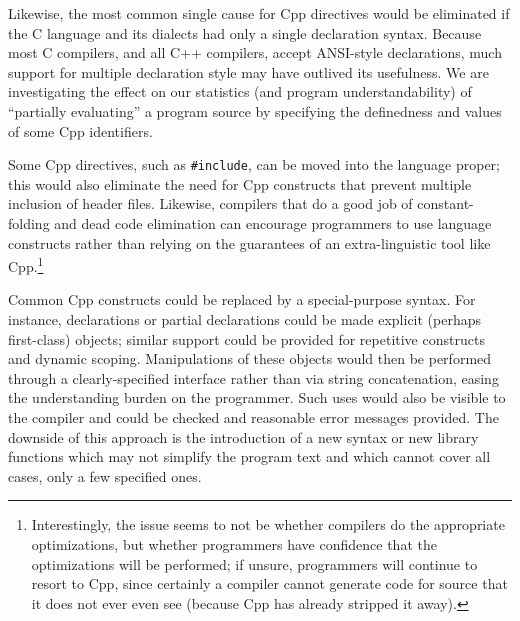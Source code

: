 \documentclass[11pt]{article}
\begin{document}
Likewise, the most common single cause for Cpp directives would be
eliminated if the C language and its dialects had only a single declaration
syntax.  Because most C compilers, and all C++ compilers, accept ANSI-style
declarations, much support for multiple declaration style may have outlived
its usefulness.  We are investigating the effect on our statistics (and
program understandability) of ``partially evaluating'' a program source by
specifying the definedness and values of some Cpp identifiers.

Some Cpp directives, such as {\tt \#include}, can be moved into the
language proper; this would also eliminate the need for Cpp constructs that
prevent multiple inclusion of header files.  Likewise, compilers that do a
good job of constant-folding and dead code elimination can encourage
programmers to use language constructs rather than relying on the
guarantees of an extra-linguistic tool like Cpp.\footnote{Interestingly,
  the issue seems to not be whether compilers do the appropriate
  optimizations, but whether programmers have confidence that the
  optimizations will be performed; if unsure, programmers will continue to
  resort to Cpp, since certainly a compiler cannot generate code for source
  that it does not ever even see (because Cpp has already stripped it
  away).}

Common Cpp constructs could be replaced by a special-purpose syntax.  For
instance, declarations or partial declarations could be made explicit
(perhaps first-class) objects; similar support could be provided for
repetitive constructs and dynamic scoping.  Manipulations of these objects would then
be performed through a clearly-specified interface rather than via string
concatenation, easing the understanding burden on the programmer.  Such
uses would also be visible to the compiler and could be checked and
reasonable error messages provided.  The downside of this approach is the
introduction of a new syntax or new library functions which may not
simplify the program text and which cannot cover all cases, only a few
specified ones.
\end{document}
